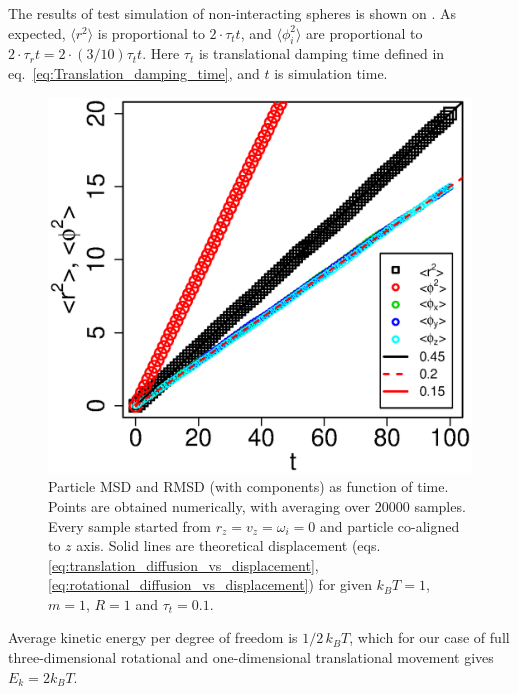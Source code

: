 The results of test simulation of non-interacting spheres is shown on . As expected, $\langle r^2\rangle$ is proportional to $2 \cdot \tau_t t$, and $\langle \phi_i^2\rangle$ are proportional to $2 \cdot \tau_r t = 2 \cdot (3/10) \tau_t t$. Here $\tau_t$ is translational damping time defined in eq.~\eqref{eq:Translation_damping_time}, and $t$ is simulation time.

\begin{figure}[h]
\centering
	\includegraphics[height=0.3\textheight]{Images/DiffusionStats_drift}
	\captionsetup{justification=centering, width=0.9\textwidth}
	\caption{Particle MSD and RMSD (with components) as function of time. Points are obtained numerically, with averaging over $20000$ samples. Every sample started from $r_z = v_z = \omega_i = 0$ and particle co-aligned to $z$ axis. Solid lines are theoretical displacement (eqs. \eqref{eq:translation_diffusion_vs_displacement}, \eqref{eq:rotational_diffusion_vs_displacement}) for given $k_BT = 1$, $m = 1$, $R = 1$ and $\tau_t = 0.1$.}
	\label{fig:diffusion_stats_mean_square_displacement}
\end{figure}

Average kinetic energy per degree of freedom is $1/2 \, k_B T$, which for our case of full three-dimensional rotational and one-dimensional translational movement gives $E_k = 2 k_B T$.

